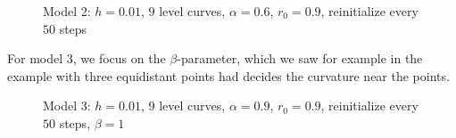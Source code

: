 \begin{figure}
\begin{center}
\end{center}
\vspace{-2.5em}
\caption[Model 2 - Noisy point set, $\alpha=0.6$]{Model 2: $h=0.01$, $9$ level curves, $\alpha=0.6$, $r_0=0.9$, reinitialize every $50$ steps}
\label{fig:m2-noisypoints-a06}
\end{figure}

For model 3, we focus on the $\beta$-parameter, which we saw for example in the example with three equidistant points had decides the curvature near the points. 



\begin{figure}
\begin{center}
\end{center}
\vspace{-2.5em}
\caption[Model 3 - Noisy point set, $\alpha=0.9$]{Model 3: $h=0.01$, $9$ level curves, $\alpha=0.9$, $r_0=0.9$, reinitialize every $50$ steps, $\beta=1$}
\label{fig:m3-noisypoints-a09}
\end{figure}

